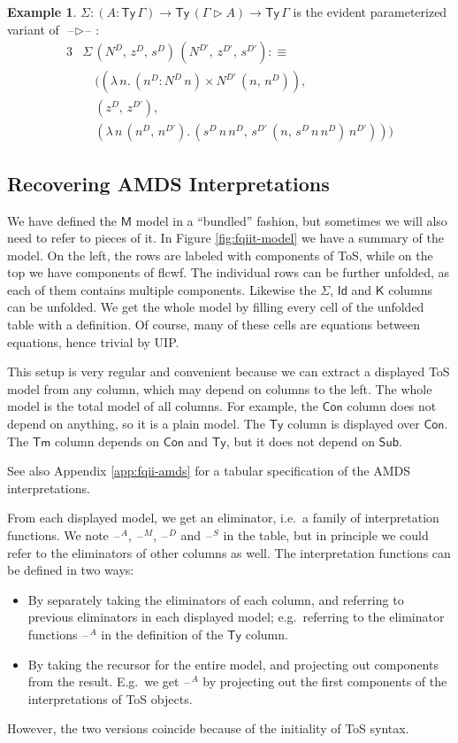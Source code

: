 \documentclass[12pt,a4paper,twoside,openany]{book}
\theoremstyle{remark}
\theoremstyle{definition}
\newtheorem{myexample}{Example}
\theoremstyle{theorem}
\newcommand{\bs}[1]{\boldsymbol{#1}}
\newcommand{\Con}{\mathsf{Con}}
\newcommand{\Sub}{\mathsf{Sub}}
\newcommand{\Tm}{\mathsf{Tm}}
\newcommand{\Ty}{\mathsf{Ty}}
\newcommand{\Id}{\mathsf{Id}}
\newcommand{\blank}{\mathord{\hspace{1pt}\text{--}\hspace{1pt}}}
\newcommand{\ext}{\triangleright}
\newcommand{\K}{\mathsf{K}}
\newcommand{\bM}{\bs{\mathsf{M}}}
\newcommand{\defn}{:\equiv}
\begin{document}
\begin{myexample}
$\Sigma : (A : \Ty\,\Gamma) \to \Ty\,(\Gamma \ext A) \to \Ty\,\Gamma$ is the
evident parameterized variant of $\blank\ext\blank$:
\begin{alignat*}{3}
  &\Sigma\,(N^D,\,z^D,\,s^D)\,(N^{D'},\,z^{D'},\,s^{D'}) \defn\\
  & \hspace{1em}((\lambda\,n.\,(n^D : N^D\,n) \times N^{D'}\,(n,\,n^D)),\,\\
  & \hspace{1em}(z^D,\,z^{D'}),\,\\
  & \hspace{1em}(\lambda\,n\,(n^D,\,n^{D'}).\,(s^D\,n\,n^D,\,s^{D'}\,(n,\,s^D\,n\,n^D)\,n^{D'})))
\end{alignat*}
\end{myexample}

\subsection{Recovering AMDS Interpretations}

We have defined the $\bM$ model in a ``bundled'' fashion, but sometimes we will
also need to refer to pieces of it. In Figure \ref{fig:fqiit-model} we have a
summary of the model. On the left, the rows are labeled with components of ToS,
while on the top we have components of flcwf. The individual rows can be further
unfolded, as each of them contains multiple components. Likewise the $\Sigma$,
$\Id$ and $\K$ columns can be unfolded. We get the whole model by filling every
cell of the unfolded table with a definition. Of course, many of these cells are
equations between equations, hence trivial by UIP.

This setup is very regular and convenient because we can extract a displayed
ToS model from any column, which may depend on columns to the left. The whole
model is the total model of all columns. For example, the $\Con$ column does not
depend on anything, so it is a plain model. The $\Ty$ column is displayed over
$\Con$. The $\Tm$ column depends on $\Con$ and $\Ty$, but it does not depend on $\Sub$.

See also Appendix \ref{app:fqii-amds} for a tabular specification of the AMDS
interpretations.

From each displayed model, we get an eliminator, i.e.\ a family of
interpretation functions. We note $\blank^A$, $\blank^M$, $\blank^D$ and
$\blank^S$ in the table, but in principle we could refer to the eliminators of
other columns as well. The interpretation functions can be defined in two ways:
\begin{itemize}
\item By separately taking the eliminators of each column, and referring to previous
      eliminators in each displayed model; e.g.\ referring to the eliminator functions $\blank^A$ in
      the definition of the $\Ty$ column.
\item By taking the recursor for the entire model, and projecting out components from the result. E.g.\
      we get $\blank^A$ by projecting out the first components of the interpretations of ToS objects.
\end{itemize}
However, the two versions coincide because of the initiality of ToS syntax.
\end{document}
